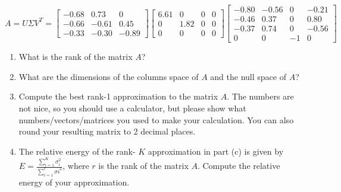 \documentclass[letter,11pt]{article}
\theoremstyle{definition}
\begin{document}
$$
A=U \Sigma V^{T}=\begin{bmatrix}
-0.68 & 0.73 & 0 \\
-0.66 & -0.61 & 0.45 \\
-0.33 & -0.30 & -0.89
\end{bmatrix}\begin{bmatrix}
6.61 & 0 & 0 & 0 \\
0 & 1.82 & 0 & 0 \\
0 & 0 & 0 & 0
\end{bmatrix}\begin{bmatrix}
-0.80 & -0.56 & 0 & -0.21 \\
-0.46 & 0.37 & 0 & 0.80 \\
-0.37 & 0.74 & 0 & -0.56 \\
0 & 0 & -1 & 0
\end{bmatrix}
$$

\begin{enumerate}[label = \alph*.)]
    \item What is the rank of the matrix $A$?
    \item What are the dimensions of the columns space of $A$ and the null space of $A$?
    \item Compute the best rank-1 approximation to the matrix $A$. The numbers are not nice, so you should use a calculator, but please show what numbers/vectors/matrices you used to make your calculation. You can also round your resulting matrix to 2 decimal places.
    \item The relative energy of the rank- $K$ approximation in part (c) is given by $E=\frac{\sum_{i=1}^{K} \sigma_{i}^{2}}{\sum_{i=1}^{r} \sigma{i}^{2}}$, where $r$ is the rank of the matrix $A$. Compute the relative energy of your approximation.
\end{enumerate}
\end{document}
